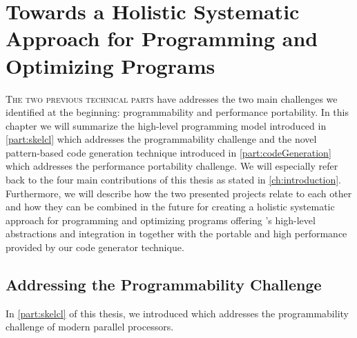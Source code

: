 
\chapter[Towards a Holistic Systematic Approach for\\ Programming and Optimizing Programs]{Towards a Holistic Systematic Approach for Programming and Optimizing Programs}

\label{ch:seventh} %

\lettrine[lines=3, loversize=0.1]{T}{he two previous technical parts } have addresses the two main challenges we identified at the beginning: programmability and performance portability.
In this chapter we will summarize \SkelCL the high-level programming model introduced in \autoref{part:skelcl} which addresses the programmability challenge and the novel pattern-based code generation technique introduced in \autoref{part:codeGeneration} which addresses the performance portability challenge.
We will especially refer back to the four main contributions of this thesis as stated in \autoref{ch:introduction}.
Furthermore, we will describe how the two presented projects relate to each other and how they can be combined in the future for creating a holistic systematic approach for programming and optimizing programs offering \SkelCL's high-level abstractions and integration in \Cpp together with the portable and high performance provided by our code generator technique.

\section{Addressing the Programmability Challenge}

In \autoref{part:skelcl} of this thesis, we introduced \SkelCL which addresses the programmability challenge of modern parallel processors.

